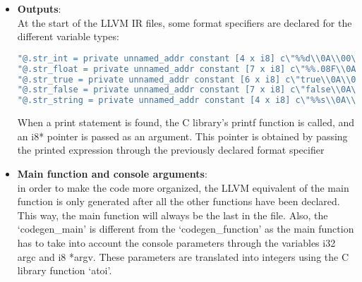 \documentclass[12pt]{article}
\begin{document}
\begin{itemize}
In the example above, the function call to func() is never executed, as the first operand of the OR operator is True. This is an example of short-circuit evaluation, where the second operand is not evaluated if the first operand is sufficient to determine the result of the expression. This optimization can be applied to both logical AND and OR operators, and can help improve the efficiency of the generated code by avoiding unnecessary evaluations.

\item \textbf{Outputs}: \\
At the start of the LLVM IR files, some format specifiers
are declared for the different variable types:

\begin{center}
    \begin{lstlisting}[language=C, basicstyle=\footnotesize\ttfamily]
"@.str_int = private unnamed_addr constant [4 x i8] c\"%%d\\0A\\00\"\n"
"@.str_float = private unnamed_addr constant [7 x i8] c\"%%.08F\\0A\\00\"\n"
"@.str_true = private unnamed_addr constant [6 x i8] c\"true\\0A\\00\"\n"
"@.str_false = private unnamed_addr constant [7 x i8] c\"false\\0A\\00\"\n"
"@.str_string = private unnamed_addr constant [4 x i8] c\"%%s\\0A\\00\"\n"
    \end{lstlisting}
\end{center}

When a print statement is found,
the C library's printf function is called, and an i8* pointer
is passed as an argument. This pointer is obtained
by passing the printed expression through the previously declared format
specifier

\item \textbf{Main function and console arguments}: \\
in order to make the code more organized, the LLVM equivalent of the main function is only generated
after all the other functions have been declared. This way, the main function will always be the last in the
file. Also, the `codegen\_main' is different from the `codegen\_function' as the main function has to take
into account the console parameters through the variables i32 argc and i8 *argv.
These parameters are translated into integers using the C library function `atoi'.



\end{itemize}
\end{document}
